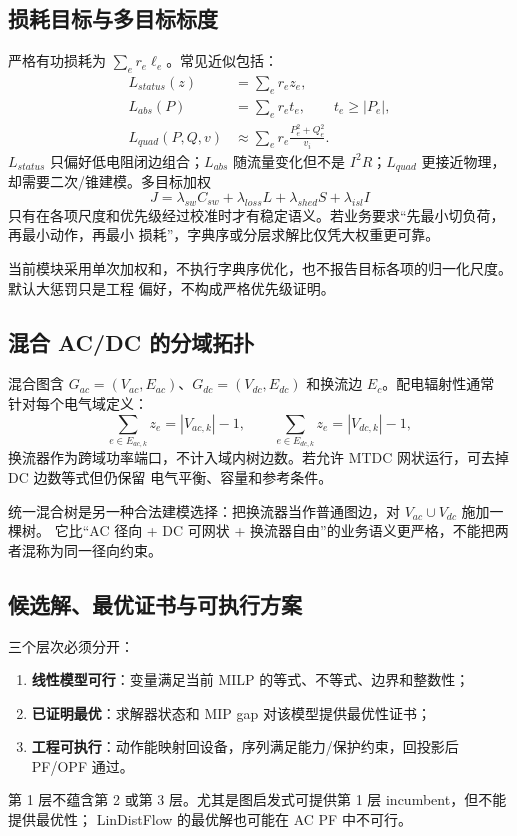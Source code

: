 \subsection{损耗目标与多目标标度}

严格有功损耗为 $\sum_e r_e\ell_e$。常见近似包括：
\begin{align}
L_{status}(z)&=\sum_e r_ez_e,\\
L_{abs}(P)&=\sum_e r_et_e,\qquad t_e\ge|P_e|,\\
L_{quad}(P,Q,v)&\approx\sum_e r_e\frac{P_e^2+Q_e^2}{v_i}.
\end{align}
$L_{status}$ 只偏好低电阻闭边组合；$L_{abs}$ 随流量变化但不是 $I^2R$；$L_{quad}$ 更接近物理，
却需要二次/锥建模。多目标加权
\begin{equation}
J=\lambda_{sw}C_{sw}+\lambda_{loss}L+\lambda_{shed}S+\lambda_{isl}I
\end{equation}
只有在各项尺度和优先级经过校准时才有稳定语义。若业务要求“先最小切负荷，再最小动作，再最小
损耗”，字典序或分层求解比仅凭大权重更可靠。

\begin{gapnote}
当前模块采用单次加权和，不执行字典序优化，也不报告目标各项的归一化尺度。默认大惩罚只是工程
偏好，不构成严格优先级证明。
\end{gapnote}

\subsection{混合 AC/DC 的分域拓扑}

混合图含 $G_{ac}=(V_{ac},E_{ac})$、$G_{dc}=(V_{dc},E_{dc})$ 和换流边 $E_c$。配电辐射性通常
针对每个电气域定义：
\begin{equation}
\sum_{e\in E_{ac,k}}z_e=|V_{ac,k}|-1,
\qquad
\sum_{e\in E_{dc,k}}z_e=|V_{dc,k}|-1,
\end{equation}
换流器作为跨域功率端口，不计入域内树边数。若允许 MTDC 网状运行，可去掉 DC 边数等式但仍保留
电气平衡、容量和参考条件。

统一混合树是另一种合法建模选择：把换流器当作普通图边，对 $V_{ac}\cup V_{dc}$ 施加一棵树。
它比“AC 径向 + DC 可网状 + 换流器自由”的业务语义更严格，不能把两者混称为同一径向约束。

\subsection{候选解、最优证书与可执行方案}

三个层次必须分开：
\begin{enumerate}
  \item \textbf{线性模型可行}：变量满足当前 MILP 的等式、不等式、边界和整数性；
  \item \textbf{已证明最优}：求解器状态和 MIP gap 对该模型提供最优性证书；
  \item \textbf{工程可执行}：动作能映射回设备，序列满足能力/保护约束，回投影后 PF/OPF 通过。
\end{enumerate}
第 1 层不蕴含第 2 或第 3 层。尤其是图启发式可提供第 1 层 incumbent，但不能提供最优性；
LinDistFlow 的最优解也可能在 AC PF 中不可行。

